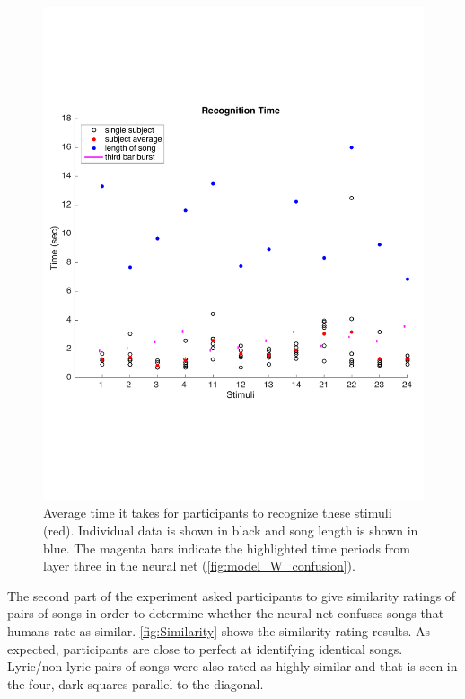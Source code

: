 \begin{figure}[h] 
  \begin{center}
    \includegraphics[width=\textwidth,keepaspectratio=true]{Figures/RecognitionTimeGraph}
    \caption{Average time it takes for participants to recognize these stimuli (red). Individual data is shown in black and song length is shown in blue. The magenta bars indicate the highlighted time periods from layer three in the neural net (\autoref{fig:model_W_confusion}).}
    \label{fig:RecognitionTime}
  \end{center}
\end{figure}

The second part of the experiment asked participants to give similarity ratings of pairs of songs in order to determine whether the neural net confuses songs that humans rate as similar. 
\autoref{fig:Similarity} shows the similarity rating results. 
As expected, participants are close to perfect at identifying identical songs. 
Lyric/non-lyric pairs of songs were also rated as highly similar and that is seen in the four, dark squares parallel to the diagonal.

